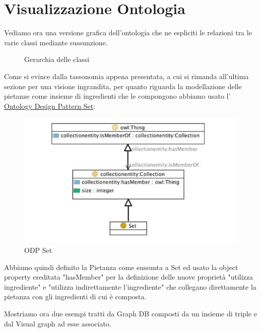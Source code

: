 \documentclass[12pt]{article}
\begin{document}
\section{Visualizzazione Ontologia}
    Vediamo ora una versione grafica dell'ontologia che ne espliciti le relazioni tra le varie classi mediante sussunzione.
    \begin{figure}[H]
        \caption{Gerarchia delle classi}
    \end{figure}
    Come si evince dalla tassonomia appena presentata, a cui si rimanda all'ultima sezione per una visione ingrandita, per quanto riguarda la modellazione delle pietanze come insieme di ingredienti che le compongono abbiamo usato l' \href{http://ontologydesignpatterns.org/wiki/Submissions:Set}{Ontology Design Pattern Set}:
    \begin{figure}[H]
        \centering
          \includegraphics[width=12cm]{files/ODPSet.png}
        \caption{ODP Set}
    \end{figure}
    Abbiamo quindi definito la Pietanza come sussunta a Set ed usato la object property ereditata "hasMember" per la definizione delle nuove proprietà "utilizza ingrediente" e "utilizza indirettamente l'ingrediente" che collegano direttamente la pietanza con gli ingredienti di cui è composta.
    \par
    Mostriamo ora due esempi tratti da Graph DB composti da un insieme di triple e dal Visual graph ad esse associato.
\end{document}
